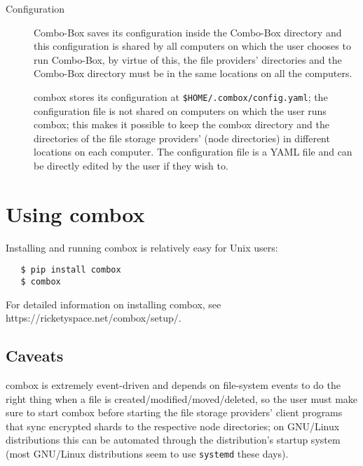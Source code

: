 \begin{description}
\item[Configuration] Combo-Box saves its configuration inside the
  Combo-Box directory and this configuration is shared by all
  computers on which the user chooses to run Combo-Box, by virtue of
  this, the file providers' directories and the Combo-Box directory
  must be in the same locations on all the computers.

  combox stores its configuration at
  \verb+$HOME/.combox/config.yaml+; the configuration file is not
  shared on computers on which the user runs combox; this makes it
  possible to keep the combox directory and the directories of the
  file storage providers' (node directories) in different locations on
  each computer. The configuration file is a YAML file and can be
  directly edited by the user if they wish to.
\end{description}

\section{Using combox}\label{1-sec-using-cb}

Installing and running combox is relatively easy for Unix users:

\begin{verbatim}
   $ pip install combox
   $ combox
\end{verbatim}

For detailed information on installing combox, see
https://ricketyspace.net/combox/setup/.

\subsection{Caveats}

combox is extremely event-driven and depends on file-system events to
do the right thing when a file is created/modified/moved/deleted, so
the user must make sure to start combox before starting the file
storage providers' client programs that sync encrypted shards to the
respective node directories; on GNU/Linux distributions this can be
automated through the distribution's startup system (most GNU/Linux
distributions seem to use \verb+systemd+\cite{website:systemd} these
days).
